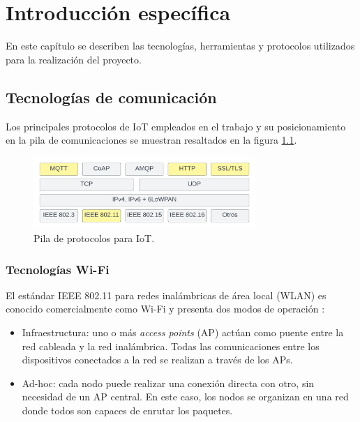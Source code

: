 \chapter{Introducción específica} %

\label{Chapter2}

En este capítulo se describen las tecnologías, herramientas y protocolos utilizados para la realización del proyecto.

\section{Tecnologías de comunicación}
\label{sec:Tecnologías de comunicación}
Los principales protocolos de IoT empleados en el trabajo y su posicionamiento en la pila de comunicaciones se muestran resaltados en la figura \ref{fig:IotProtocols}.


\begin{figure}[h]
	\centering
	\includegraphics[width=0.75\textwidth]{./Figures/protocols.jpeg}
	\caption[Pila de protocolos para IoT.]{Pila de protocolos para IoT\protect\footnotemark.}
	\label{fig:IotProtocols}

\end{figure}

\subsection{Tecnologías Wi-Fi}
\label{sec:Tecnologías Wi-Fi}
El estándar IEEE 802.11 para redes inalámbricas de área local (WLAN) es conocido comercialmente como Wi-Fi y presenta dos modos de operación \citep{wifi}:
\begin{itemize}
\item Infraestructura: uno o más \textit{access points} (AP) actúan como puente entre la red cableada y la red inalámbrica. Todas las comunicaciones entre los dispositivos conectados a la red se realizan a través de los APs. 
\item Ad-hoc: cada nodo puede realizar una conexión directa con otro, sin necesidad de un AP central. En este caso, los nodos se organizan en una red donde todos son capaces de enrutar los paquetes.  
\end{itemize}

